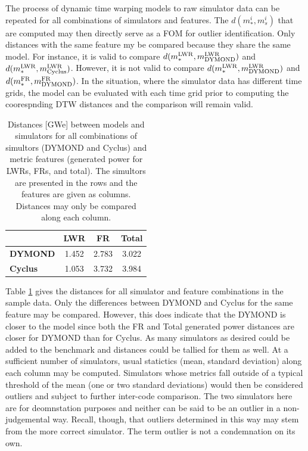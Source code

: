 The process of dynamic time warping models to raw simulator data can be 
repeated for all combinations of simulators and features. The 
$d(m_*^i, m_s^i)$ that are computed may then directly serve as a FOM for
outlier identification. Only distances with the same feature my be compared
because they share the same model. For instance, it is valid to compare
$d(m_*^{\mathrm{LWR}}, m_{\mathrm{DYMOND}}^{\mathrm{LWR}})$ and $d(m_*^{\mathrm{LWR}}, m_{\mathrm{Cyclus}}^{\mathrm{LWR}})$. However,  
it is not valid to compare $d(m_*^{\mathrm{LWR}}, m_{\mathrm{DYMOND}}^{\mathrm{LWR}})$ and 
$d(m_*^{\mathrm{FR}}, m_{\mathrm{DYMOND}}^{\mathrm{FR}})$.  In the situation, where the simulator data
has different time grids, the model can be evaluated with each time grid
prior to computing the coorespnding DTW distances and the comparison will
remain valid.

\begin{table}[htb]
\centering
\caption{Distances [GWe] between models and simulators for all combinations of 
simultors (DYMOND and Cyclus) and metric features (generated power for 
LWRs, FRs, and total). The simultors are presented in the rows and the
features are given as columns. Distances may only be compared along 
each column.}
\label{d-compare}
\begin{tabular}{l|c|c|c|}
                & \textbf{LWR} & \textbf{FR} & \textbf{Total} \\
\hline
\textbf{DYMOND} & 1.452        & 2.783       & 3.022          \\
\hline
\textbf{Cyclus} & 1.053        & 3.732       & 3.984          \\
\hline
\end{tabular}
\end{table}

Table \ref{d-compare} gives the distances for all simulator and feature 
combinations in the sample data. Only the differences between DYMOND and 
Cyclus for the same feature may be compared.  However, this does 
indicate that the DYMOND is closer to the model since both the FR and Total
generated power distances are closer for DYMOND than for Cyclus.  As many
simulators as desired could be added to the benchmark and distances could 
be tallied for them as well. At a sufficient number of simulators, usual 
statictics (mean, standard deviation) along each column may be computed.
Simulators whose metrics fall outside of a typical threshold of the mean
(one or two standard deviations) would then be considered outliers and 
subject to further inter-code comparison. The two simulators here are 
for deomnstation purposes and neither can be said to be an outlier in a
non-judgemental way. Recall, though, that outliers determined in this way 
may stem from the more correct simulator. The term outlier is not a 
condemnation on its own.

